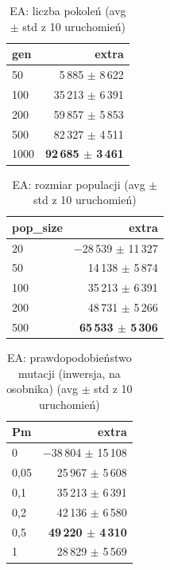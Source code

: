 
\begin{table}[H]
  \centering
  \small
  \caption{EA: liczba pokoleń (avg $\pm$ std z 10 uruchomień)}
  \label{tab:ea-gen}
  \begin{tabular}{lr}
    \toprule
    gen & extra \\
    \midrule
    50 & 5\,885 $\pm$ 8\,622 \\
    100 & 35\,213 $\pm$ 6\,391 \\
    200 & 59\,857 $\pm$ 5\,853 \\
    500 & 82\,327 $\pm$ 4\,511 \\
    1000 & \textbf{92\,685 $\pm$ 3\,461} \\
    \bottomrule
  \end{tabular}
\end{table}

\begin{table}[H]
  \centering
  \small
  \caption{EA: rozmiar populacji (avg $\pm$ std z 10 uruchomień)}
  \label{tab:ea-pop}
  \begin{tabular}{lr}
    \toprule
    pop\_size & extra \\
    \midrule
    20 & $-$28\,539 $\pm$ 11\,327 \\
    50 & 14\,138 $\pm$ 5\,874 \\
    100 & 35\,213 $\pm$ 6\,391 \\
    200 & 48\,731 $\pm$ 5\,266 \\
    500 & \textbf{65\,533 $\pm$ 5\,306} \\
    \bottomrule
  \end{tabular}
\end{table}

\begin{table}[H]
  \centering
  \small
  \caption{EA: prawdopodobieństwo mutacji (inwersja, na osobnika) (avg $\pm$ std z 10 uruchomień)}
  \label{tab:ea-pm-inversion}
  \begin{tabular}{lr}
    \toprule
    Pm & extra \\
    \midrule
    0 & $-$38\,804 $\pm$ 15\,108 \\
    0{,}05 & 25\,967 $\pm$ 5\,608 \\
    0{,}1 & 35\,213 $\pm$ 6\,391 \\
    0{,}2 & 42\,136 $\pm$ 6\,580 \\
    0{,}5 & \textbf{49\,220 $\pm$ 4\,310} \\
    1 & 28\,829 $\pm$ 5\,569 \\
    \bottomrule
  \end{tabular}
\end{table}

